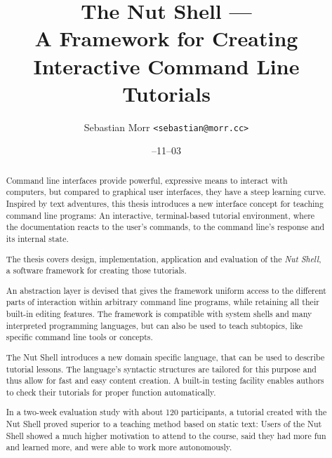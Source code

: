 \documentclass[paper=a4,twoside,abstract=on,cleardoublepage=empty,numbers=noenddot,toc=bib,toc=listof,12pt,appendixprefix=true]{scrreprt}
\title{The Nut Shell ---\\A Framework for Creating\\Interactive Command Line Tutorials}
\author{\sffamily Sebastian Morr \texttt{<sebastian@morr.cc>}}
\date{\sffamily 2013--11--03}
\begin{document}
\maketitle
\restoregeometry


\begin{abstract}
    Command line interfaces provide powerful, expressive means to interact with computers, but compared to graphical user interfaces, they have a steep learning curve. Inspired by text adventures, this thesis introduces a new interface concept for teaching command line programs: An interactive, terminal-based tutorial environment, where the documentation reacts to the user's commands, to the command line's response and its internal state.

    The thesis covers design, implementation, application and evaluation of the \emph{Nut Shell}, a software framework for creating those tutorials.

    An abstraction layer is devised that gives the framework uniform access to the different parts of interaction within arbitrary command line programs, while retaining all their built-in editing features. The framework is compatible with system shells and many interpreted programming languages, but can also be used to teach subtopics, like specific command line tools or concepts.

    The Nut Shell introduces a new domain specific language, that can be used to describe tutorial lessons. The language's syntactic structures are tailored for this purpose and thus allow for fast and easy content creation. A built-in testing facility enables authors to check their tutorials for proper function automatically.

    In a two-week evaluation study with about 120 participants, a tutorial created with the Nut Shell proved superior to a teaching method based on static text: Users of the Nut Shell showed a much higher motivation to attend to the course, said they had more fun and learned more, and were able to work more autonomously.
\end{abstract}
\end{document}
